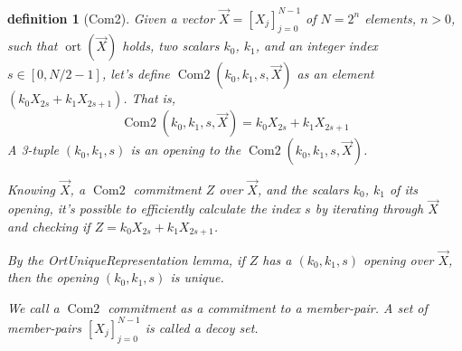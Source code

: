 \documentclass{mathcryptology} %
\DeclareMathOperator{\ort}{ort}
\DeclareMathOperator{\ComTwo}{Com2}
\theoremstyle{title}
\newtheorem*{titledefinition}{definition}
\theoremstyle{titleof}
\begin{document}
    \begin{titledefinition}[Com2]
        Given a vector $\vec{X}={\left[X_{j}\right]}_{j=0}^{N-1}$ of $N=2^{n}$ elements, $n>0$, such that $\ort\left( \vec{X}\right)$ holds, two scalars $k_{0}$, $k_{1}$, and an integer index $s\in\left[0,N/2-1\right]$, let's define $\ComTwo\left(k_{0}, k_{1}, s, \vec{X}\right)$ as an element $\left(k_{0} X_{2s} + k_{1} X_{2s+1}\right)$. That is,
        \begin{equation*}
            \ComTwo\left(k_{0}, k_{1}, s, \vec{X}\right) = k_{0} X_{2s} + k_{1} X_{2s+1}
        \end{equation*}
        A 3-tuple $\left(k_{0}, k_{1}, s\right)$ is an opening to the $\ComTwo\left(k_{0}, k_{1}, {s}, \vec{X}\right)$.

        Knowing $\vec{X}$, a $\ComTwo$ commitment $Z$ over $\vec{X}$, and the scalars $k_{0}$, $k_{1}$ of its opening, it's possible to efficiently calculate the index $s$ by iterating through $\vec{X}$ and checking if $Z=k_{0} X_{2s} + k_{1} X_{2s+1}$.

        By the OrtUniqueRepresentation lemma, if $Z$ has a $\left(k_{0}, k_{1}, s\right)$ opening over $\vec{X}$, then the opening $\left(k_{0}, k_{1}, s\right)$ is unique.

        We call a $\ComTwo$ commitment as a commitment to a member-pair. A set of member-pairs ${\left[X_{j}\right]}_{j=0}^{N-1}$ is called a decoy set.
    \end{titledefinition}


\end{document}
